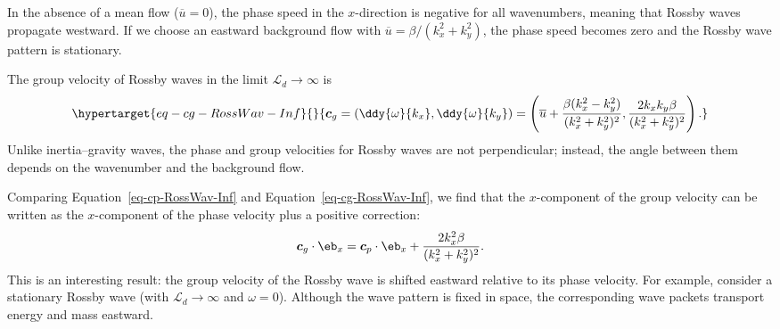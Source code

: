 \documentclass[
  letterpaper,
  twocolumn,
  landscape]{report}
\begin{document}
\begin{tcolorbox}[enhanced jigsaw, toprule=.15mm, left=2mm, opacityback=0, breakable, arc=.35mm, colback=white, rightrule=.15mm, bottomrule=.15mm, colframe=quarto-callout-note-color-frame, leftrule=.75mm]
\begin{minipage}[t]{5.5mm}
\textcolor{quarto-callout-note-color}{\faInfo}
\end{minipage}%
\begin{minipage}[t]{\textwidth - 5.5mm}

In the absence of a mean flow (\(\overline{u} = 0\)), the phase speed in
the \(x\)-direction is negative for all wavenumbers, meaning that Rossby
waves propagate westward. If we choose an eastward background flow with
\(\overline{u} = \beta / (k_x^2+k_y^2)\), the phase speed becomes zero
and the Rossby wave pattern is stationary.

\end{minipage}%
\end{tcolorbox}

The group velocity of Rossby waves in the limit
\(\mathcal{L}_d \to \infty\) is
\begin{equation}\protect\hypertarget{eq-cg-RossWav-Inf}{}{
    \boldsymbol{c}_g = \left(\ddy{\omega}{k_x} ,\ddy{\omega}{k_y} \right) = \left( \overline{u} + \frac{\beta(k_x^2-k_y^2)}{(k_x^2+k_y^2)^2}, \frac{2 k_x k_y \beta}{(k_x^2+k_y^2)^2}\right).
}\label{eq-cg-RossWav-Inf}\end{equation} Unlike inertia--gravity waves,
the phase and group velocities for Rossby waves are not perpendicular;
instead, the angle between them depends on the wavenumber and the
background flow.

Comparing Equation~\ref{eq-cp-RossWav-Inf} and
Equation~\ref{eq-cg-RossWav-Inf}, we find that the \(x\)-component of
the group velocity can be written as the \(x\)-component of the phase
velocity plus a positive correction: \[
    \boldsymbol{c}_g \cdot \eb_x = \boldsymbol{c}_p \cdot \eb_x + \frac{2 k_x^2 \beta}{(k_x^2+k_y^2)^2}.
\] This is an interesting result: the group velocity of the Rossby wave
is shifted eastward relative to its phase velocity. For example,
consider a stationary Rossby wave (with \(\mathcal{L}_d \to \infty\) and
\(\omega = 0\)). Although the wave pattern is fixed in space, the
corresponding wave packets transport energy and mass eastward.
\end{document}
